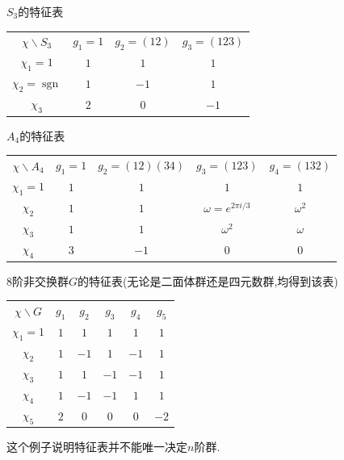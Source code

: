 \begin{example} $S_3$的特征表
    \begin{center}
    \begin{tabular}{c|c|c|c} 
    $\chi \backslash S_3$ & $g_1=1$ & $g_2=(12)$ & $g_3=(123)$ \\
    $\chi_1=1$ & $1$ & $1$ &  $1$\\
    $\chi_2=\operatorname{sgn}$ & $1$ & $-1$ &  $1$\\
    $\chi_3$ & $2$ & $0$ &  $-1$
    \end{tabular}
    \end{center}
\end{example}

\begin{example} $A_4$的特征表
    \begin{center}
    \begin{tabular}{c|c|c|c|c} 
    $\chi \backslash A_4$ & $g_1=1$ & $g_2=(12)(34)$ & $g_3=(123)$ & $g_4=(132)$\\
    $\chi_1=1$ & $1$ & $1$ &  $1$ & $1$\\
    $\chi_2$ & $1$ & $1$ &  $\omega=e^{2\pi i/3}$ & $\omega^2$\\
    $\chi_3$ & $1$ & $1$ &  $\omega^2$ & $\omega$ \\
    $\chi_4$ & $3$ & $-1$ & $0$ & $0$
    \end{tabular}
    \end{center}
\end{example}

\begin{example} $8$阶非交换群$G$的特征表(无论是二面体群还是四元数群,均得到该表)
    \begin{center}
    \begin{tabular}{c|c|c|c|c|c} 
    $\chi \backslash G$ & $g_1$ & $g_2$ & $g_3$ & $g_4$ & $g_5$\\
    $\chi_1=1$ & $1$ & $1$ &  $1$ & $1$ & $1$\\
    $\chi_2$ & $1$ & $-1$ &  $1$ & $-1$ & $1$\\
    $\chi_3$ & $1$ & $1$ &  $-1$ & $-1$ & $1$\\
    $\chi_4$ & $1$ & $-1$ & $-1$ & $1$ & $1$\\
    $\chi_5$ & $2$ & $0$ & $0$ & $0$ & $-2$
    \end{tabular}
    \end{center}
这个例子说明特征表并不能唯一决定$n$阶群.
\end{example}


